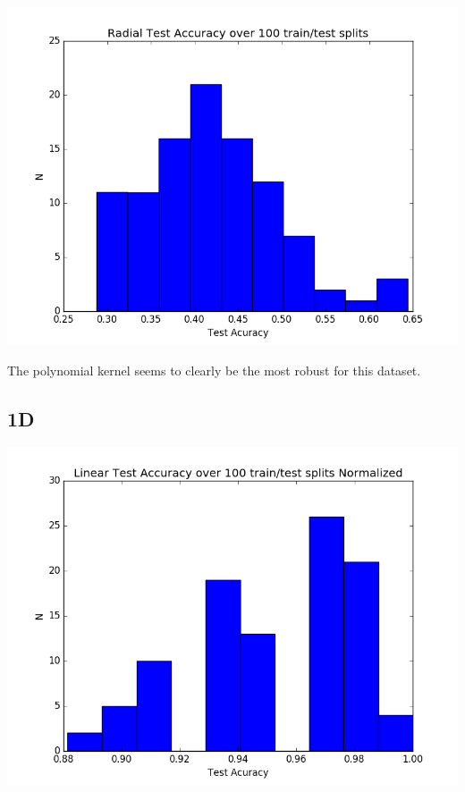 \documentclass[12pt]{article}
\begin{document}
\begin{flushleft}
			\includegraphics[scale=0.5]{HW3_1C_1.png}
			\label{fig:graph 1C.2}
			
			The polynomial kernel seems to clearly be the most robust for this dataset.\\
		
		\subsection*{1D}
		
			\includegraphics[scale=0.5]{HW3_1D_0.png}
			\label{fig:graph 1D.1}
			

\end{flushleft}
\end{document}
